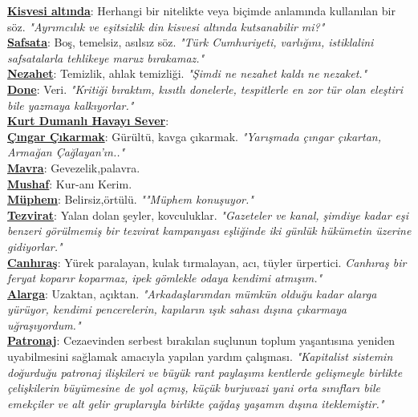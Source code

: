 \documentclass[twocolumn]{article}
\begin{document}
\noindent \underline{\textbf{Kisvesi altında}}:\textsf{ Herhangi bir nitelikte veya biçimde anlamında kullanılan bir söz. }\textit{"Ayrımcılık ve eşitsizlik din kisvesi altında kutsanabilir mi?" } \\
\noindent \underline{\textbf{Safsata}}:\textsf{ Boş, temelsiz, asılsız söz. }\textit{"Türk Cumhuriyeti, varlığını, istiklalini safsatalarla tehlikeye maruz bırakamaz." } \\
\noindent \underline{\textbf{Nezahet}}:\textsf{ Temizlik, ahlak temizliği. }\textit{"Şimdi ne nezahet kaldı ne nezaket." } \\
\noindent \underline{\textbf{Done}}:\textsf{ Veri. }\textit{"Kritiği bıraktım, kısıtlı donelerle, tespitlerle en zor tür olan eleştiri bile yazmaya kalkıyorlar."} \\
\noindent \underline{\textbf{Kurt Dumanlı Havayı Sever}}:\textsf{ }\textit{ } \\
\noindent \underline{\textbf{Çıngar Çıkarmak}}:\textsf{ Gürültü, kavga çıkarmak. }\textit{"Yarışmada çıngar çıkartan, Armağan Çağlayan'ın.." } \\
\noindent \underline{\textbf{Mavra}}:\textsf{ Gevezelik,palavra. }\textit{ } \\
\noindent \underline{\textbf{Mushaf}}:\textsf{ Kur-anı Kerim. }\textit{ } \\
\noindent \underline{\textbf{Müphem}}:\textsf{ Belirsiz,örtülü. }\textit{""Müphem konuşuyor."} \\
\noindent \underline{\textbf{Tezvirat}}:\textsf{ Yalan dolan şeyler, kovculuklar. }\textit{"Gazeteler ve kanal, şimdiye kadar eşi benzeri görülmemiş bir tezvirat kampanyası eşliğinde iki günlük hükümetin üzerine gidiyorlar."} \\
\noindent \underline{\textbf{Canhıraş}}:\textsf{ Yürek paralayan, kulak tırmalayan, acı, tüyler ürpertici. }\textit{Canhıraş bir feryat koparır koparmaz, ipek gömlekle odaya kendimi atmışım."} \\
\noindent \underline{\textbf{Alarga}}:\textsf{ Uzaktan, açıktan. }\textit{"Arkadaşlarımdan mümkün olduğu kadar alarga yürüyor, kendimi pencerelerin, kapıların ışık sahası dışına çıkarmaya uğraşıyordum."} \\
\noindent \underline{\textbf{Patronaj}}:\textsf{ Cezaevinden serbest bırakılan suçlunun toplum yaşantısına yeniden uyabilmesini sağlamak amacıyla yapılan yardım çalışması. }\textit{"Kapitalist sistemin doğurduğu patronaj ilişkileri ve büyük rant paylaşımı kentlerde gelişmeyle birlikte çelişkilerin büyümesine de yol açmış, küçük burjuvazi yani orta sınıfları bile emekçiler ve alt gelir gruplarıyla birlikte çağdaş yaşamın dışına iteklemiştir."} \\
\end{document}

